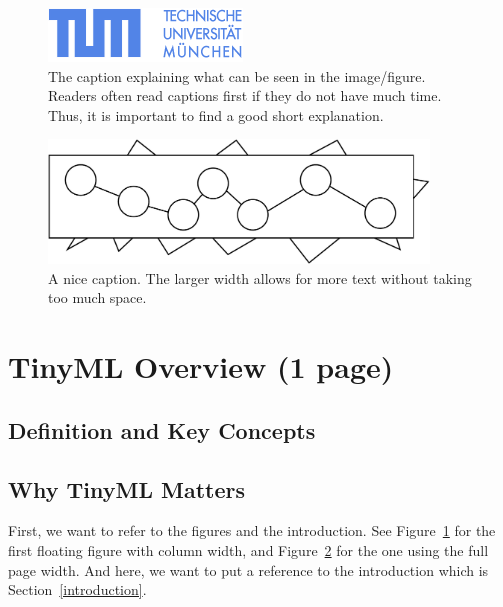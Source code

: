 \documentclass[A4,twocolumn]{article}
\begin{document}
\begin{figure}
\centerline{
\includegraphics[width=0.9\columnwidth]{TUM-Logo-102.png}
}
\caption{The caption explaining what can be seen in the image/figure.
Readers often read captions first if they do not have much time. Thus,
it is important to find a good short explanation.}
\label{TUM}
\end{figure}

\begin{figure}[t]
\centerline{
\includegraphics[width=0.9\textwidth]{test.pdf}
}
\caption{A nice caption. The larger width allows for more text without
taking too much space.}
\label{Fig2}
\end{figure}


\section{TinyML Overview (1 page)}

\subsection{Definition and Key Concepts}
\subsection{Why TinyML Matters}

First, we want to refer to the figures and the introduction.
See Figure~\ref{TUM} for the first floating figure with column width,
and Figure~\ref{Fig2} for the one using the full page width.
And here, we want to put a reference to the introduction which is
Section~\ref{introduction}.
\end{document}
